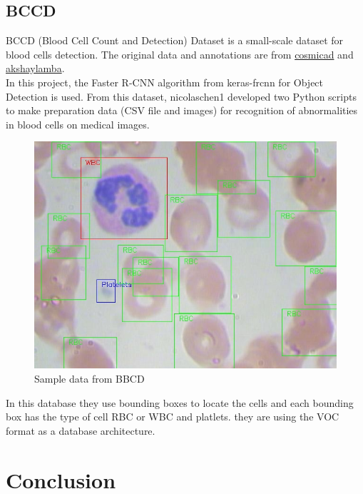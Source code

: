 \subsection{BCCD}
BCCD (Blood Cell Count and Detection) Dataset is a small-scale dataset for blood cells detection. The original data and annotations are from \href{https://github.com/cosmicad/dataset}{cosmicad}  and \href{https://github.com/akshaylamba/all_CELL_data}{akshaylamba}. \\
In this project, the Faster R-CNN algorithm from keras-frcnn for Object Detection is used. From this dataset, nicolaschen1 developed two Python scripts to make preparation data (CSV file and images) for recognition of abnormalities in blood cells on medical images.

\begin{figure}[H]
\centering
\includegraphics[width=\linewidth]{../images/BBCD1.jpg}
\caption{Sample data from BBCD}
\label{fig:BBCD1}
\end{figure}

In this database they use bounding boxes to locate the cells and each bounding box has the type of cell RBC or WBC and platlets. they are using the VOC format as a database architecture.

\newpage
\section{Conclusion}
\hspace*{0.16in}



\newpage
